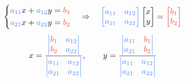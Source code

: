 \begin{multicols}{2}
{        
        \begin{equation*}
            \begin{dcases}
                \xmemphB{a_{11}} x + \xmemphB{a_{12}} y = \xmemphR{b_1} \\
                \xmemphB{a_{21}} x + \xmemphB{a_{22}} y = \xmemphR{b_2}
            \end{dcases}
            \quad \Rightarrow \quad
                \xmemphB{
                    \begin{bmatrix}
                        a_{11} & a_{12} \\
                        a_{21} & a_{22}
                    \end{bmatrix}
                }
                \begin{bmatrix}
                    x \\
                    y
                \end{bmatrix}
                =
                \xmemphR{
                    \begin{bmatrix}
                        b_1 \\
                        b_2
                    \end{bmatrix}
                }
        \end{equation*}
        \begin{equation*}
                x
                    = \frac{
                        \xmemphB{
                            \begin{vmatrix}
                                \xmemphR{b_1} & a_{12} \\
                                \xmemphR{b_2} & a_{22}
                            \end{vmatrix}
                        }
                    }{
                        \xmemphB{
                            \begin{vmatrix}
                                a_{11} & a_{12} \\
                                a_{21} & a_{22}
                            \end{vmatrix}
                        }
                    }
                    ,\qquad
                y
                    = \frac{
                        \xmemphB{
                            \begin{vmatrix}
                                a_{11} & \xmemphR{b_1} \\
                                a_{21} & \xmemphR{b_2}
                            \end{vmatrix}
                        }
                    }{
                        \xmemphB{
                            \begin{vmatrix}
                                a_{11} & a_{12} \\
                                a_{21} & a_{22}
                            \end{vmatrix}
                        }
                    }
        \end{equation*}

}
\end{multicols}

